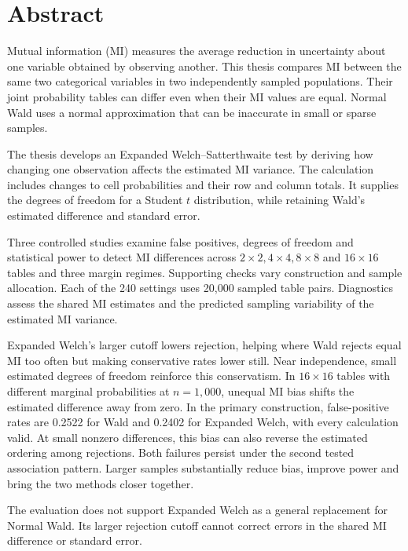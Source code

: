 \chapter*{Abstract}

Mutual information (MI) measures the average reduction in uncertainty about
one variable obtained by observing another.
This thesis compares MI between the same two categorical variables in
two independently sampled populations. Their joint probability tables
can differ even when their MI values are equal. Normal Wald uses a normal
approximation that can be inaccurate in small or sparse samples.

The thesis develops an Expanded Welch--Satterthwaite test by
deriving how changing one observation affects the estimated MI variance.
The calculation includes changes to cell probabilities and their row
and column totals. It supplies the degrees of freedom for a Student
\(t\) distribution, while retaining Wald's estimated difference and
standard error.

Three controlled studies examine false positives, degrees of freedom and
statistical power to detect MI differences across \(2\times2,4\times4,8\times8\) and
\(16\times16\) tables and three margin regimes. Supporting checks
vary construction and sample allocation. Each of the 240 settings uses
20,000 sampled table pairs. Diagnostics assess the shared MI estimates
and the predicted sampling variability of the estimated MI variance.

Expanded Welch's larger cutoff lowers rejection, helping where Wald rejects
equal MI too often but making conservative rates lower still. Near independence,
small estimated degrees of freedom reinforce this conservatism. In
\(16\times16\) tables with different marginal probabilities at
\(n=1{,}000\), unequal MI bias shifts the estimated difference away
from zero. In the primary construction, false-positive rates are
0.2522 for Wald and 0.2402 for Expanded Welch, with every calculation
valid. At small nonzero differences, this bias can also reverse the
estimated ordering among rejections. Both failures persist under the
second tested association pattern. Larger samples substantially reduce
bias, improve power and bring the two methods closer together.

The evaluation does not support Expanded Welch as a general replacement
for Normal Wald. Its larger rejection cutoff cannot correct errors in the
shared MI difference or standard error.
